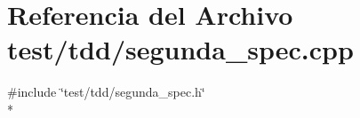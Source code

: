 \section{Referencia del Archivo test/tdd/segunda\+\_\+spec.cpp}
\label{segunda__spec_8cpp}
{\ttfamily \#include \char`\"{}test/tdd/segunda\+\_\+spec.\+h\char`\"{}}\\*
